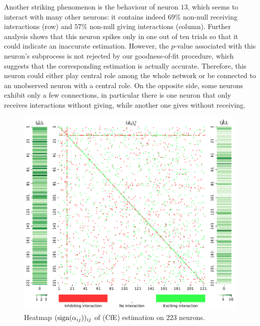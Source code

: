 Another striking phenomenon is the behaviour of neuron $13$, which seems to interact with many other neurons: it contains indeed $69\%$ non-null receiving interactions (row) and $57\%$ non-null giving interactions (column). Further analysis shows that this neuron spikes only in one out of ten trials so that it could indicate an inaccurate estimation. However, the $p$-value associated with this neuron's subprocess is not rejected by our goodness-of-fit procedure, which suggests that the corresponding estimation is actually accurate. Therefore, this neuron could either play central role among the whole network or be connected to an unobserved neuron with a central role. On the opposite side, some neurons exhibit only a few connections, in particular there is one neuron that only receives interactions without giving, while another one gives without receiving.

{\begin{figure}[!ht]
\centering
\includegraphics[width=0.8\linewidth]{images/chapter3/heatmap_mu_beta.pdf}
\caption{Heatmap $(\operatorname{sign}(\alpha_{ij}))_{ij}$ of (CfE) estimation on 223 neurons.}
\label{fig:chap3_heatmap_CfE}
\end{figure}}

